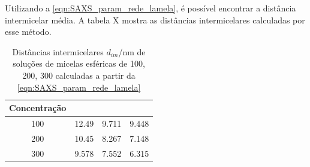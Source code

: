 	Utilizando a \autoref{eqn:SAXS_param_rede_lamela}, é possível encontrar a distância intermicelar média. A tabela X mostra as distâncias intermicelares calculadas por esse método.
	
	
		\begin{table}[h]
		\IBGEtab%
		{\caption{Distâncias intermicelares \(d_{im}\)/nm de soluções de micelas esféricas de \CTDTAB{} 100, 200, 300 \mM{} calculadas a partir da \autoref{eqn:SAXS_param_rede_lamela}}
			\label{tab:SAXS_dim}}%
		{\begin{tabular}{c c c c}
			\toprule
			Concentração & \CTAB  & \TTAB & \DTAB  \\ \midrule
			    100      & 12.49 & 9.711 & 9.448 \\
			    200      & 10.45 & 8.267 & 7.148 \\
			    300      & 9.578 & 7.552 & 6.315 \\ \bottomrule
		\end{tabular}}%
		{}
	\end{table}  %
	
